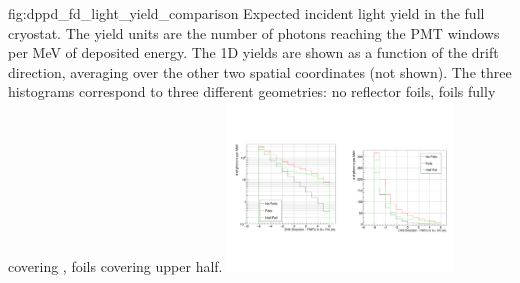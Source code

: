 \begin{dunefigure}{fig:dppd_fd_light_yield_comparison}
{Expected incident light yield in the full   cryostat. The yield units are the number of photons reaching the PMT windows per \si{\MeV} of deposited energy. The 1D yields are shown as a function of the drift direction, averaging over the other two spatial coordinates (not shown). The three histograms correspond to three different geometries: no  reflector foils, foils fully covering , foils covering upper  half.}
\includegraphics[trim={0cm 5.cm 14cm 5.cm}, clip, width=0.45\textwidth]{graphics/dppd_fd_light_yield_comparison.pdf}
\end{dunefigure}

